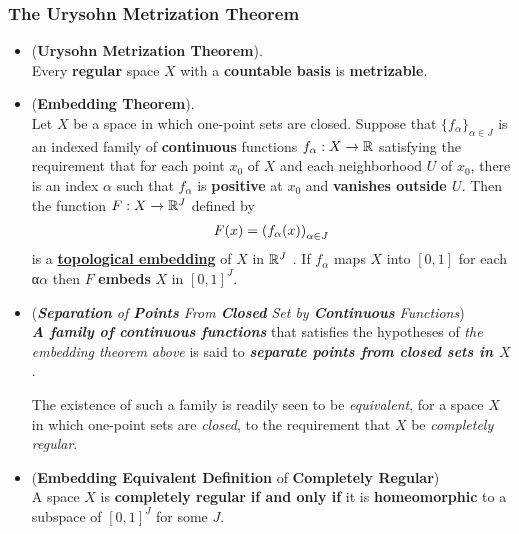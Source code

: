 \documentclass[11pt]{article}
\begin{document}
\subsubsection{The Urysohn Metrization Theorem}
\begin{itemize}
\item \begin{theorem} (\textbf{Urysohn Metrization Theorem}). \citep{munkres2000topology}\\
Every \textbf{regular} space $X$ with a \textbf{countable basis} is \textbf{metrizable}.
\end{theorem}

\item \begin{theorem} (\textbf{Embedding Theorem}).  \citep{munkres2000topology}\\
Let $X$ be a space in which one-point sets are closed. Suppose that $\{f_{\alpha}\}_{\alpha \in J}$ is an indexed family of \textbf{continuous} functions $f_{\alpha}: X \rightarrow {\mathbb R}$ satisfying the requirement that for each point $x_0$ of $X$ and each neighborhood $U$ of $x_0$, there is an index $\alpha$ such that $f_{\alpha}$ is \textbf{positive} at $x_0$ and \textbf{vanishes outside $U$}. Then the function $F : X \rightarrow {\mathbb R}^J$ defined by
\begin{align*}
F(x) = \left(f_{\alpha}(x)\right)_{\alpha \in J}
\end{align*}
is a \underline{\textbf{topological embedding}} of $X$ in ${\mathbb R}^J$ . If $f_{\alpha}$ maps $X$ into $[0, 1]$ for each α$\alpha$  then $F$ \textbf{embeds} $X$ in
$[0, 1]^J$.
\end{theorem}

\item \begin{definition} (\emph{\textbf{Separation} of \textbf{Points} From \textbf{Closed} Set by \textbf{Continuous} Functions})\\
\emph{\textbf{A family of continuous functions}} that satisfies the hypotheses of \emph{the embedding theorem above} is said to \emph{\textbf{separate points from closed sets in $X$}}. 

The existence of such a family is readily seen to be \emph{equivalent}, for a space $X$ in which one-point sets are \emph{closed}, to the requirement that $X$ be \emph{completely regular}.
\end{definition}

\item \begin{corollary} (\textbf{Embedding Equivalent Definition} of \textbf{Completely Regular}) \citep{munkres2000topology}\\
A space $X$ is \textbf{completely regular} \textbf{if and only if} it is \textbf{homeomorphic} to a subspace of $[0, 1]^J$ for some $J$.
\end{corollary}
\end{itemize}
\end{document}
